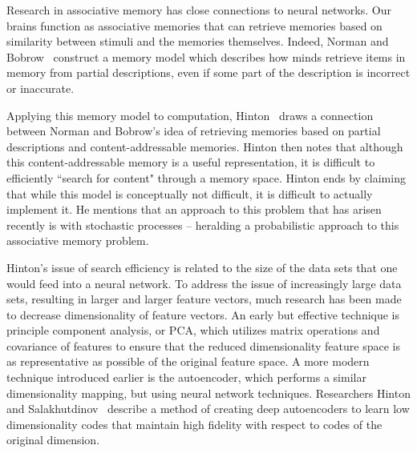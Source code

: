 \documentclass{sig-alternate}
\begin{document}
Research in associative memory has close connections to neural networks. Our brains function as 
associative memories that can retrieve memories based on similarity between stimuli and the memories 
themselves.  Indeed, Norman and Bobrow~\cite{bobrow} construct a memory model which describes how 
minds retrieve items in memory from partial descriptions, even if some part of the description is 
incorrect or inaccurate. 

Applying this memory model to computation, Hinton~\cite{hinton} draws a connection between Norman 
and Bobrow's idea of retrieving memories based on partial descriptions and content-addressable 
memories.  Hinton then notes that although this content-addressable memory is a useful 
representation, it is difficult to efficiently ``search for content" through a memory space. 
Hinton ends by claiming that while this model is conceptually not difficult, it is difficult to 
actually implement it. He mentions that an approach to this problem that has arisen recently is with 
stochastic processes -- heralding a probabilistic approach to this associative memory problem.

Hinton's issue of search efficiency is related to the size of the data sets that
one would feed into a neural network.  To address the issue of increasingly large data sets, 
resulting in larger and larger feature vectors, much research has been made to decrease 
dimensionality of feature vectors. An early but effective technique is principle component
analysis, or PCA, which utilizes matrix operations and covariance of features to ensure
that the reduced dimensionality feature space is as representative as possible of the original
feature space. A more modern technique introduced earlier is the autoencoder, which performs a
similar dimensionality mapping, but using neural network techniques. Researchers Hinton 
and Salakhutdinov~\cite{autoencoder} describe a method of creating deep autoencoders to learn low 
dimensionality codes that maintain high fidelity with respect to codes of the original dimension.
\end{document}

